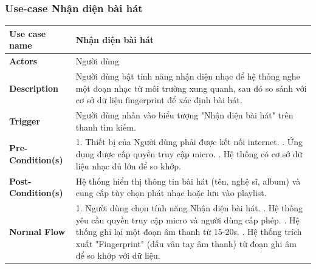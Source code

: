 \documentclass[a4paper]{article}
\begin{document}
\subsubsection{Use-case Nhận diện bài hát}
\begin{table}[H]
	\centering
	\renewcommand{\arraystretch}{1.3} %
	\begin{tabularx}{\textwidth}{|l|X|}
		\hline
		\textbf{Use case name} & Nhận diện bài hát                                                                                                                                                  \\ \hline
		\textbf{Actors}        & Người dùng                                                                                                                                                         \\ \hline
		\textbf{Description}   & Người dùng bật tính năng nhận diện nhạc để hệ thống nghe một đoạn nhạc từ môi trường xung quanh, sau đó so sánh với cơ sở dữ liệu fingerprint để xác định bài hát. \\ \hline
		\textbf{Trigger}       & Người dùng nhấn vào biểu tượng "Nhận diện bài hát" trên thanh tìm kiếm.                                                                                            \\ \hline
		\textbf{Pre-Condition(s)}
		                       & 1. Thiết bị của Người dùng phải được kết nối internet. \newline
		2. Ứng dụng được cấp quyền truy cập micro. \newline
		3. Hệ thống có cơ sở dữ liệu nhạc đủ lớn để so khớp.                                                                                                                                        \\ \hline
		\textbf{Post-Condition(s)}
		                       & Hệ thống hiển thị thông tin bài hát (tên, nghệ sĩ, album) và cung cấp tùy chọn phát nhạc hoặc lưu vào playlist.                                                    \\ \hline
		\textbf{Normal Flow}
		                       & 1. Người dùng chọn tính năng Nhận diện bài hát. \newline
		2. Hệ thống yêu cầu quyền truy cập micro và người dùng cấp phép. \newline
		3. Hệ thống ghi lại một đoạn âm thanh từ 15-20s. \newline
		4. Hệ thống trích xuất "Fingerprint" (dấu vân tay âm thanh) từ đoạn ghi âm để so khớp với dữ liệu. \newline

\end{tabularx}
\end{table}
\end{document}
